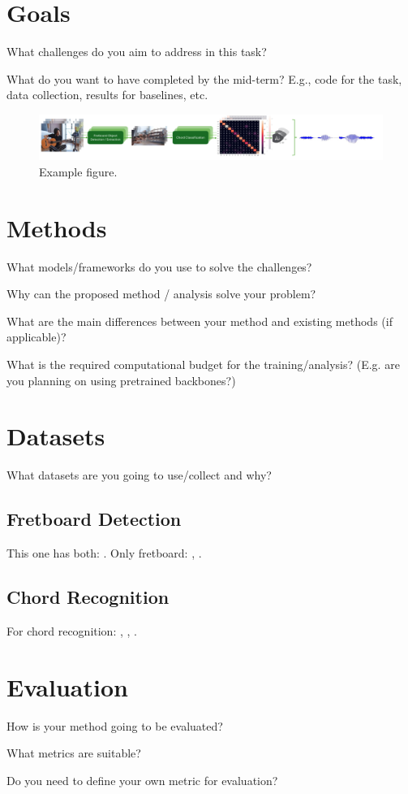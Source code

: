 \documentclass[10pt,twocolumn,letterpaper]{article}
\begin{document}
\section{Goals}

What challenges do you aim to address in this task?

What do you want to have completed by the mid-term? E.g., code for the task, data collection, results for baselines, etc.


\begin{figure}[h]\label{fig:diagram}
    \centering
    \includegraphics[width=\textwidth]{images/task-diagram.pdf}
    \caption{Example figure.}
    \label{fig:figure1}
\end{figure}


\section{Methods}

What models/frameworks do you use to solve the challenges?

Why can the proposed method / analysis solve your problem?

What are the main differences between your method and existing methods (if applicable)?

What is the required computational budget for the training/analysis? (E.g. are you planning on using pretrained backbones?)

\section{Datasets}

What datasets are you going to use/collect and why?


\subsection{Fretboard Detection}
This one has both: \cite{guitar-chords-daewp_dataset}. 
Only fretboard: \cite{guitar-ppfil_dataset}, \cite{done-npcll_dataset}.

\subsection{Chord Recognition}
For chord recognition: \cite{guitar-chord-tvon8_dataset}, \cite{guitar-chord-bounding-box_dataset}, \cite{guitar-chord-handshape_dataset}.

\section{Evaluation}

How is your method going to be evaluated?

What metrics are suitable?

Do you need to define your own metric for evaluation?

\clearpage 

{\small


}
\end{document}
